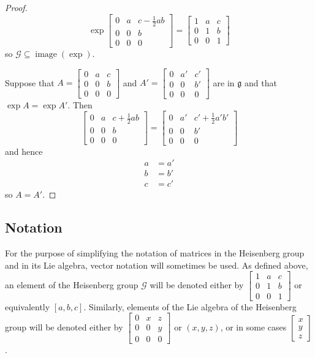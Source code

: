 \documentclass[honours]{UNSWthesis}
\newcommand{\G}{\mathcal{G}}
\newcommand{\g}{\mathfrak{g}}
\newcommand{\1}{\mathbf{e}_{1}}
\newcommand{\2}{\mathbf{e}_{3}}
\newcommand{\3}{\mathbf{e}_{3}}
\DeclareMathOperator{\image}{image}
\begin{document}
\begin{proof}
\[ 
\exp  \begin{bmatrix} 0 & a & c-\frac{1}{2}ab \\ 0 & 0 & b \\ 0 & 0 & 0 \end{bmatrix} = \begin{bmatrix} 1 & a & c \\ 0 & 1 & b \\ 0 & 0 & 1 \end{bmatrix}
\]
so $\G \subseteq \image(\exp)$.

Suppose that $A=\begin{bmatrix} 0 & a & c \\ 0 & 0 & b \\ 0 & 0 & 0 \end{bmatrix}$ and $A'=\begin{bmatrix} 0 & a' & c' \\ 0 & 0 & b' \\ 0 & 0 & 0 \end{bmatrix}$ are in $\g$ and that $\exp{A}=\exp{A'}$. Then 
\[
\begin{bmatrix} 0 & a & c+\frac{1}{2}ab \\ 0 & 0 & b \\ 0 & 0 & 0 \end{bmatrix} =\begin{bmatrix} 0 & a' & c' +\frac{1}{2}a' b' \\ 0 & 0 & b' \\ 0 & 0 & 0 \end{bmatrix}
\] 
and hence
\begin{align*}
a &= a' \\
b &= b' \\
c &= c'
\end{align*}
so $A=A'$.
\end{proof}




\subsection*{Notation}
For the purpose of simplifying the notation of matrices in the Heisenberg group and in its Lie algebra, vector notation will sometimes be used. As defined above, an element of the Heisenberg group $\G$ will be denoted either by $ \begin{bmatrix} 1 & a & c \\ 0 & 1 & b \\ 0 & 0 & 1 \end{bmatrix} $ or equivalently $[a,b,c]$. Similarly, elements of the Lie algebra of the Heisenberg group will be denoted either by $\begin{bmatrix} 0 & x & z \\ 0 & 0 & y \\ 0 & 0 & 0 \end{bmatrix}$ or $(x,y,z)$, or in some cases $\begin{bmatrix} x \\ y \\ z \end{bmatrix}$.
\end{document}

